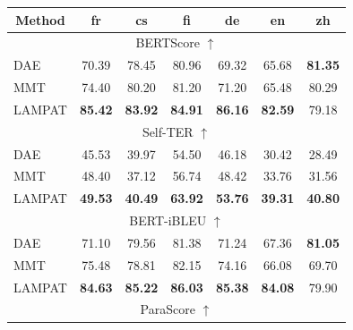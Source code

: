 \documentclass[letterpaper]{article} %
\begin{document}
\begin{table}[h!]
    \centering
    {\fontsize{9pt}{9pt}\selectfont
    \begin{tabular}{|l|cccccc|}
\hline
\multicolumn{1}{|c|}{Method} &
  \multicolumn{1}{c}{fr} &
  \multicolumn{1}{c}{cs} &
  \multicolumn{1}{c}{fi} &
  \multicolumn{1}{c}{de} &
  \multicolumn{1}{c}{en} &
  \multicolumn{1}{c|}{zh} \\ \hline
\multicolumn{7}{|c|}{BERTScore $\uparrow$}                                                                                                                \\ \hline
DAE               & 70.39          & 78.45          & 80.96          & 69.32          & 65.68          & \textbf{81.35} \\
MMT & 74.40          & 80.20          & 81.20          & 71.20          & 65.48          & 80.29          \\
LAMPAT                 & \textbf{85.42} & \textbf{83.92} & \textbf{84.91} & \textbf{86.16} & \textbf{82.59} & 79.18          \\ \hline
\multicolumn{7}{|c|}{Self-TER $\uparrow$}                                                                                                                 \\ \hline
DAE               & 45.53          & 39.97          & 54.50          & 46.18          & 30.42          & 28.49          \\
MMT & 48.40          & 37.12          & 56.74          & 48.42          & 33.76          & 31.56          \\
LAMPAT                 & \textbf{49.53} & \textbf{40.49} & \textbf{63.92} & \textbf{53.76} & \textbf{39.31} & \textbf{40.80} \\ \hline
\multicolumn{7}{|c|}{BERT-iBLEU $\uparrow$}                                                                                                               \\ \hline
DAE               & 71.10          & 79.56          & 81.38          & 71.24          & 67.36          & \textbf{81.05} \\
MMT & 75.48          & 78.81          & 82.15          & 74.16          & 66.08          & 69.70          \\
LAMPAT                 & \textbf{84.63} & \textbf{85.22} & \textbf{86.03} & \textbf{85.38} & \textbf{84.08} & 79.90          \\ \hline
\multicolumn{7}{|c|}{ParaScore $\uparrow$}                                                                                                                \\ \hline

\end{tabular}}
\end{table}
\end{document}
